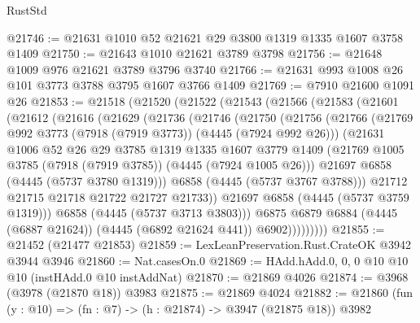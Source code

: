\begin{lexlean}{RustStd}
\begin{coremodule}
{\begin{coremodule}
{{{{{{{{{{{{{{{{{{{{{{{{{{{{{{{{{{{{{{@21746 := @21631 @1010 @52 @21621 @29 @3800 @1319 @1335 @1607 @3758 @1409
@21750 := @21643 @1010 @21621 @3789 @3798
@21756 := @21648 @1009 @976 @21621 @3789 @3796 @3740
@21766 := @21631 @993 @1008 @26 @101 @3773 @3788 @3795 @1607 @3766 @1409
@21769 := @7910 @21600 @1091 @26
@21853 := @21518
    (@21520
      (@21522
        (@21543
          (@21566
            (@21583
              (@21601
                (@21612
                  (@21616
                    (@21629
                      (@21736
                        (@21746
                          (@21750
                            (@21756
                              (@21766
                                (@21769 @992 @3773 (@7918 (@7919 @3773)) (@4445 (@7924 @992 @26)))
                                (@21631
                                  @1006
                                  @52
                                  @26
                                  @29
                                  @3785
                                  @1319
                                  @1335
                                  @1607
                                  @3779
                                  @1409
                                  (@21769
                                    @1005
                                    @3785
                                    (@7918 (@7919 @3785))
                                    (@4445 (@7924 @1005 @26)))
                                  @21697
                                  @6858
                                  (@4445 (@5737 @3780 @1319)))
                                @6858
                                (@4445 (@5737 @3767 @3788)))
                              @21712
                              @21715
                              @21718
                              @21722
                              @21727
                              @21733))
                          @21697
                          @6858
                          (@4445 (@5737 @3759 @1319)))
                        @6858
                        (@4445 (@5737 @3713 @3803)))
                      @6875
                      @6879
                      @6884
                      (@4445 (@6887 @21624))
                      (@4445 (@6892 @21624 @441))
                      @6902)))))))))
@21855 := @21452 (@21477 @21853)
@21859 := LexLeanPreservation.Rust.CrateOK @3942 @3944 @3946
@21860 := Nat.casesOn.{0}
@21869 := HAdd.hAdd.{0, 0, 0} @10 @10 @10 (instHAdd.{0} @10 instAddNat)
@21870 := @21869 @4026
@21874 := @3968 (@3978 (@21870 @18)) @3983
@21875 := @21869 @4024
@21882 := @21860 (fun (y : @10) => (fn : @7) -> (h : @21874) -> @3947 (@21875 @18)) @3982
}}}}}}}}}}}}}}}}}}}}}}}}}}}}}}}}}}}}}}
\end{coremodule}}
\end{coremodule}
\end{lexlean}
